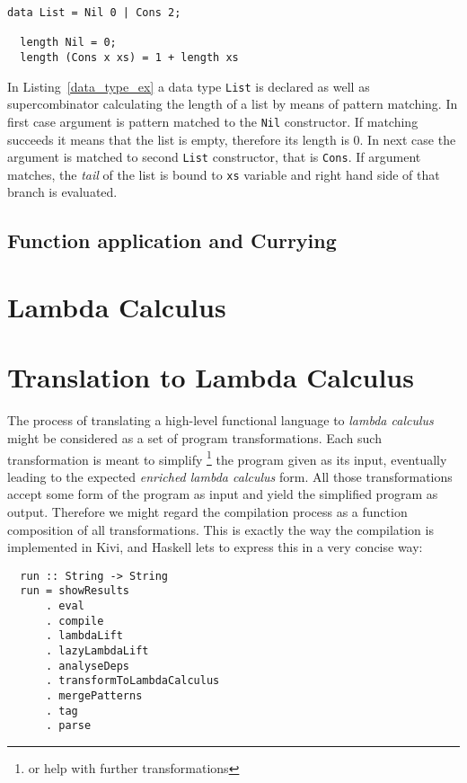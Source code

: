 \documentclass[a4paper]{report}
\begin{document}
\begin{lstlisting}[label=data_type_ex,caption={Calculating length of list.}]
  data List = Nil 0 | Cons 2;

  length Nil = 0;
  length (Cons x xs) = 1 + length xs
\end{lstlisting}

In Listing~\ref{data_type_ex} a data type \texttt{List} is declared as well as
supercombinator calculating the length of a list by means of pattern matching.
In first case argument is pattern matched to the \texttt{Nil} constructor. If
matching succeeds it means that the list is empty, therefore its length is 0.
In next case the argument is matched to second \texttt{List} constructor, that
is \texttt{Cons}. If argument matches, the \textit{tail} of the list is bound to
\texttt{xs} variable and right hand side of that branch is evaluated.

\subsection{Function application and Currying}
\section{Lambda Calculus}

\section{Translation to Lambda Calculus}
The process of translating a high-level functional language to \textit{lambda
calculus} might be considered as a set of program transformations. Each such
transformation is meant to simplify \footnote{or help with further
transformations} the program given as its input, eventually leading to the
expected \textit{enriched lambda calculus} form.
All those transformations accept some form of the program as input and yield
the simplified program as output. Therefore we might regard the compilation
process as a function composition of all transformations. This is exactly the
way the compilation is implemented in Kivi, and Haskell lets to express this
in a very concise way:

\begin{verbatim}
  run :: String -> String
  run = showResults
      . eval
      . compile
      . lambdaLift
      . lazyLambdaLift
      . analyseDeps
      . transformToLambdaCalculus
      . mergePatterns
      . tag
      . parse
\end{verbatim}
\end{document}
